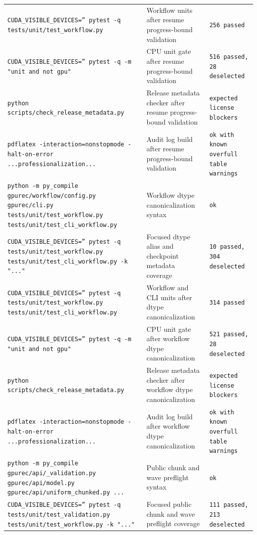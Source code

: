 \documentclass[11pt]{article}
\begin{document}
\begin{center}
\begin{tabular}{lll}
\texttt{CUDA\_VISIBLE\_DEVICES='' pytest -q tests/unit/test\_workflow.py} &
Workflow units after resume progress-bound validation &
\texttt{256 passed} \\
\texttt{CUDA\_VISIBLE\_DEVICES='' pytest -q -m "unit and not gpu"} &
CPU unit gate after resume progress-bound validation &
\texttt{516 passed, 28 deselected} \\
\texttt{python scripts/check\_release\_metadata.py} &
Release metadata checker after resume progress-bound validation &
\texttt{expected license blockers} \\
\texttt{pdflatex -interaction=nonstopmode -halt-on-error ...professionalization...} &
Audit log build after resume progress-bound validation &
\texttt{ok with known overfull table warnings} \\
\texttt{python -m py\_compile gpurec/workflow/config.py gpurec/cli.py tests/unit/test\_workflow.py tests/unit/test\_cli\_workflow.py} &
Workflow dtype canonicalization syntax &
\texttt{ok} \\
\texttt{CUDA\_VISIBLE\_DEVICES='' pytest -q tests/unit/test\_workflow.py tests/unit/test\_cli\_workflow.py -k "..."} &
Focused dtype alias and checkpoint metadata coverage &
\texttt{10 passed, 304 deselected} \\
\texttt{CUDA\_VISIBLE\_DEVICES='' pytest -q tests/unit/test\_workflow.py tests/unit/test\_cli\_workflow.py} &
Workflow and CLI units after dtype canonicalization &
\texttt{314 passed} \\
\texttt{CUDA\_VISIBLE\_DEVICES='' pytest -q -m "unit and not gpu"} &
CPU unit gate after workflow dtype canonicalization &
\texttt{521 passed, 28 deselected} \\
\texttt{python scripts/check\_release\_metadata.py} &
Release metadata checker after workflow dtype canonicalization &
\texttt{expected license blockers} \\
\texttt{pdflatex -interaction=nonstopmode -halt-on-error ...professionalization...} &
Audit log build after workflow dtype canonicalization &
\texttt{ok with known overfull table warnings} \\
\texttt{python -m py\_compile gpurec/api/\_validation.py gpurec/api/model.py gpurec/api/uniform\_chunked.py ...} &
Public chunk and wave preflight syntax &
\texttt{ok} \\
\texttt{CUDA\_VISIBLE\_DEVICES='' pytest -q tests/unit/test\_validation.py tests/unit/test\_workflow.py -k "..."} &
Focused public chunk and wave preflight coverage &
\texttt{111 passed, 213 deselected} \\

\end{tabular}
\end{center}
\end{document}
